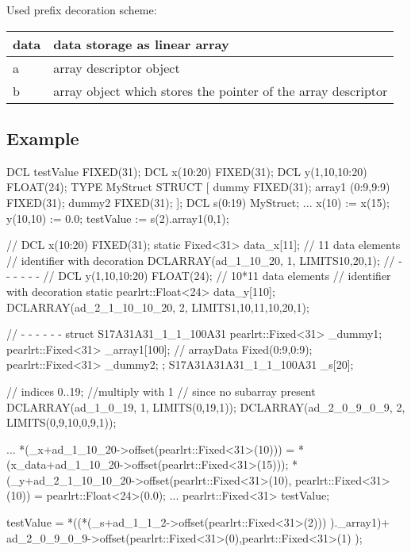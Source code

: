 Used prefix decoration scheme:

\begin{tabular}{|l|l|}
\hline
data & data storage as linear array \\
\hline
a & array descriptor object \\
\hline
b & array object which stores the pointer of the array descriptor \\
\hline
\end{tabular}

\subsection{Example}

\begin{PEARLCode}
DCL testValue FIXED(31); 
DCL x(10:20) FIXED(31); 
DCL y(1,10,10:20) FLOAT(24); 
TYPE MyStruct STRUCT [
           dummy FIXED(31);
           array1 (0:9,9:9) FIXED(31);
           dummy2 FIXED(31);
           ];
DCL s(0:19) MyStruct;
...
x(10) := x(15);
y(10,10) := 0.0;
testValue := s(2).array1(0,1);
\end{PEARLCode}


\begin{CppCode}
// DCL x(10:20) FIXED(31); 
static Fixed<31> data_x[11]; // 11 data elements
                             // identifier with decoration
DCLARRAY(ad_1_10_20, 1, LIMITS{{10,20,1}});
// - - - - - - 
// DCL y(1,10,10:20) FLOAT(24); 
 // 10*11 data elements
 // identifier with decoration
static pearlrt::Float<24> data_y[110];
DCLARRAY(ad_2_1_10_10_20, 2, LIMITS{{1,10,11},{10,20,1}});

// - - - - - - 
   struct S17A31A31_1_1_100A31 {
      pearlrt::Fixed<31> _dummy1;
      pearlrt::Fixed<31> _array1[100];
         // arrayData Fixed(0:9,0:9);
      pearlrt::Fixed<31> _dummy2;
   } ;
   S17A31A31A31_1_1_100A31 _s[20]; 

                        // indices 0..19;
                        //multiply with 1
                        // since no subarray present
   DCLARRAY(ad_1_0_19, 1, LIMITS({{0,19,1}}));
   DCLARRAY(ad_2_0_9_0_9, 2, LIMITS({{0,9,10},{0,9,1}}));

...
   *(_x+ad_1_10_20->offset(pearlrt::Fixed<31>(10))) =
             *(x_data+ad_1_10_20->offset(pearlrt::Fixed<31>(15)));
   *(_y+ad_2_1_10_10_20->offset(pearlrt::Fixed<31>(10),
            pearlrt::Fixed<31>(10)) =
                          pearlrt::Float<24>(0.0);
...
   pearlrt::Fixed<31> testValue;

   testValue = 
        *((*(_s+ad_1_1_2->offset(pearlrt::Fixed<31>(2))) )._array1)+
             ad_2_0_9_0_9->offset(pearlrt::Fixed<31>(0),pearlrt::Fixed<31>(1)
        );

\end{CppCode}


